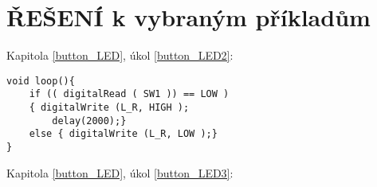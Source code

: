 \documentclass[12pt]{article}
\begin{document}
\newpage
\section{ŘEŠENÍ k vybraným příkladům}

Kapitola \ref{button_LED}, úkol \ref{button_LED2}:
\begin{lstlisting}
void loop(){
	if (( digitalRead ( SW1 )) == LOW )
	{ digitalWrite (L_R, HIGH );
		delay(2000);}
	else { digitalWrite (L_R, LOW );}
}
\end{lstlisting}  %

\hrulefill

Kapitola \ref{button_LED}, úkol \ref{button_LED3}:

\end{document}
